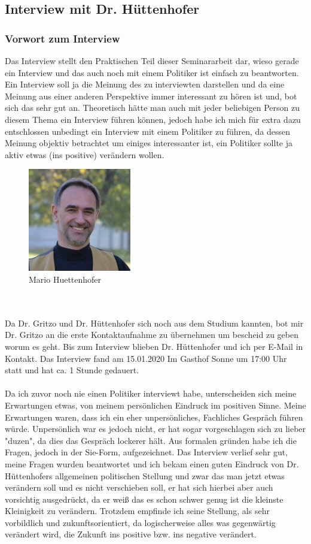 \newpage
\subsection{Interview mit Dr. Hüttenhofer}

\subsubsection{Vorwort zum Interview}
Das Interview stellt den Praktischen Teil dieser Seminararbeit dar, wieso gerade ein Interview und das auch noch mit einem Politiker ist einfach zu beantworten. Ein Interview soll ja die Meinung des zu interviewten darstellen und da eine Meinung aus einer anderen Perspektive immer interessant zu hören ist und, bot sich das sehr gut an. Theoretisch hätte man auch mit jeder beliebigen Person zu diesem Thema ein Interview führen können, jedoch habe ich mich für extra dazu entschlossen unbedingt ein Interview mit einem Politiker zu führen, da dessen Meinung objektiv betrachtet um einiges interessanter ist, ein Politiker sollte ja aktiv etwas (ins positive) verändern wollen.
\begin{figure}
    \includegraphics[width=4.5cm]{Mario.jpg}
    \caption{Mario Huettenhofer \cite{Gruene}}
\end{figure}\\
\\
Da Dr. Gritzo und Dr. Hüttenhofer sich noch aus dem Studium kannten, bot mir Dr. Gritzo an die erste Kontaktaufnahme zu übernehmen um bescheid zu geben worum es geht. Bis zum Interview blieben Dr. Hüttenhofer und ich per E-Mail in Kontakt. Das Interview fand am 15.01.2020 Im Gasthof \glqq Sonne\grqq{} um 17:00 Uhr statt und hat ca. 1 Stunde gedauert.\\
\\
Da ich zuvor noch nie einen Politiker interviewt habe, unterscheiden sich meine Erwartungen etwas, von meinem persönlichen Eindruck im positiven Sinne. Meine Erwartungen waren, dass ich ein eher unpersönliches, Fachliches Gespräch führen würde. Unpersönlich war es jedoch nicht, er hat sogar vorgeschlagen sich zu lieber "duzen", da dies das Gespräch lockerer hält. Aus formalen gründen habe ich die Fragen, jedoch in der \glqq Sie\grqq{}-Form, aufgezeichnet. Das Interview verlief sehr gut, meine Fragen wurden beantwortet und ich bekam einen guten Eindruck von Dr. Hüttenhofers allgemeinen politischen Stellung und zwar das man jetzt etwas verändern soll und es nicht verschieben soll, er hat sich hierbei aber auch vorsichtig ausgedrückt, da er weiß das es schon schwer genug ist die kleinste Kleinigkeit zu verändern. Trotzdem empfinde ich seine Stellung, als sehr vorbildlich und zukunftsorientiert, da logischerweise alles was gegenwärtig verändert wird, die Zukunft ins positive bzw. ins negative verändert.\\
